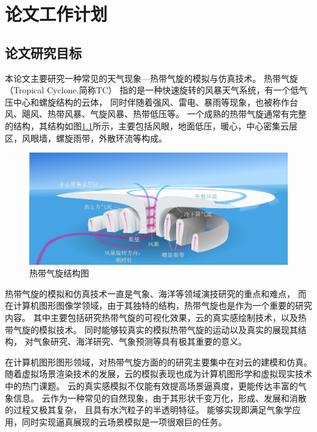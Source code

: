 
\chapter{论文工作计划}
\label{chap:research_plan}

\section{论文研究目标}
\label{sect:research_goal}

本论文主要研究一种常见的天气现象---热带气旋的模拟与仿真技术。
热带气旋（Tropical Cyclone,简称TC）
指的是一种快速旋转的风暴天气系统，有一个低气压中心和螺旋结构的云体，
同时伴随着强风、雷电、暴雨等现象，也被称作台风、飓风、热带风暴、气旋风暴、热带低压等。
一个成熟的热带气旋通常有完整的结构，其结构如图\ref{fig:tc_structure}所示，主要包括风眼，地面低压，暖心，中心密集云层区，风眼墙，螺旋雨带，外散环流等构成。
\begin{figure}[h!]
	\centering
	\includegraphics[width=400bp]{figure/tcstructure.jpg}
	\caption{热带气旋结构图}
	\label{fig:tc_structure}
\end{figure}

热带气旋的模拟和仿真技术一直是气象、海洋等领域演技研究的重点和难点，
而在计算机图形图像学领域，由于其独特的结构，热带气旋也是作为一个重要的研究内容。
其中主要包括研究热带气旋的可视化效果，云的真实感绘制技术，以及热带气旋的模拟技术。
同时能够较真实的模拟热带气旋的运动以及真实的展现其结构，
对气象研究、海洋研究、气象预测等具有极其重要的意义。

在计算机图形图形领域，对热带气旋方面的的研究主要集中在对云的建模和仿真。
随着虚拟场景渲染技术的发展，云的模拟表现也成为计算机图形学和虚拟现实技术中的热门课题。
云的真实感模拟不仅能有效提高场景逼真度，更能传达丰富的气象信息。
云作为一种常见的自然现象，由于其形状千变万化，形成、发展和消散的过程又极其复杂，
且具有水汽粒子的半透明特征。
能够实现即满足气象学应用，同时实现逼真展现的云场景模拟是一项很艰巨的任务。

